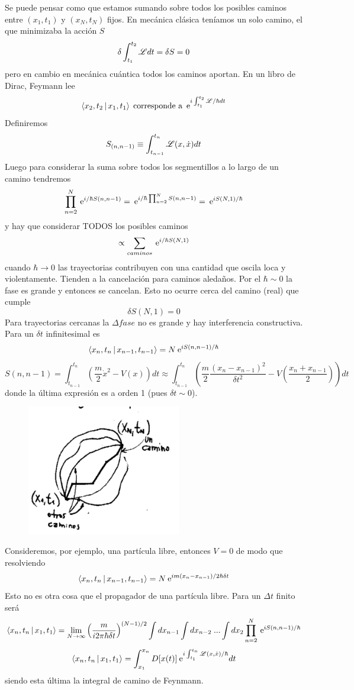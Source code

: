 \documentclass[10pt,oneside]{CBFT_book}
\begin{document}
Se puede pensar como que estamos sumando sobre todos los posibles caminos entre $(x_1,t_1)$ y $(x_N,t_N)$ 
fijos. En mecánica clásica teníamos un solo camino, el que minimizaba la acción $S$
\[
	\delta \int_{t_1}^{t_2} \mathscr{L} dt = \delta S = 0
\]
pero en cambio en mecánica cuántica todos los caminos aportan. En un libro de Dirac, Feymann lee 
\[
	\Braket{x_2,t_2|x_1,t_1} \; \text{corresponde a} \; \:\mathrm{e}^{i\int_{t_1}^{t_2}\mathscr{L}/\hbar dt}
\]
Definiremos
\[
	S_{(n,n-1)}\equiv \int_{t_{n-1}}^{t_n}\mathscr{L}(x,\dot{x}) dt
\]
Luego para considerar la suma sobre todos los segmentillos a lo largo de un camino tendremos
\[
	\prod_{n=2}^N \:\mathrm{e}^{i/\hbar S(n,n-1)} = \:\mathrm{e}^{i/\hbar \prod_{n=2}^N S(n,n-1)} = \:\mathrm{e}^{iS(N,1)/\hbar}
\]
y hay que considerar TODOS los posibles caminos 
\[
	\propto \sum_{caminos} \:\mathrm{e}^{i/\hbar S(N,1)} 
\]
cuando $\hbar \to 0$ las trayectorias contribuyen con una cantidad que oscila loca y violentamente. Tienden a 
la cancelación para caminos aledaños. Por el $\hbar \sim 0$ la fase es grande y entonces se cancelan.
Esto no ocurre cerca del camino (real) que cumple 
\[
	\delta S(N,1) = 0
\]
Para trayectorias cercanas la $\Delta fase$ no es grande y hay interferencia constructiva.
Para un $\delta t$ infinitesimal es 
\[
	\Braket{x_n,t_n|x_{n-1},t_{n-1}} = N \:\mathrm{e}^{iS(n,n-1)/\hbar}
\]
\[
	S(n,n-1) = \int_{t_{n-1}}^{t_n} \left( \frac{m}{2}\dot{x}^2 - V(x)\right) dt \approx
	\int_{t_{n-1}}^{t_n} \left( \frac{m}{2} \frac{(x_n-x_{n-1})^2}{\delta t^2} - 
	V\left(\frac{x_n+x_{n-1}}{2}\right)\right)  dt
\]
donde la última expresión es a orden 1 (pues $\delta t \sim 0$).
\begin{figure}[htb]
	\begin{center}
	\includegraphics[width=0.6\textwidth]{images/teo2_9.pdf}
	\end{center}
	\caption{}
\end{figure} 

Consideremos, por ejemplo, una partícula libre, entonces $V=0$ de modo que resolviendo 
\[
	\Braket{x_n,t_n|x_{n-1},t_{n-1}} = N \:\mathrm{e}^{im(x_n - x_{n-1})/2\hbar\delta t}
\]
Esto no es otra cosa que el propagador de una partícula libre. Para un $\Delta t$ finito será 
\[
	\Braket{x_n,t_n|x_1,t_1}  = \lim_{N\to\infty} \left(\frac{m}{i2\pi\hbar\delta t}\right)^{(N-1)/2}
	\int dx_{n-1}\int dx_{n-2} \; ... \int dx_2 \prod_{n=2}^N \:\mathrm{e}^{i S(n,n-1)/\hbar}
\]
\[
	\Braket{x_n,t_n|x_1,t_1}  = \int_{x_1}^{x_n} D[x(t)] \:\mathrm{e}^{i \int _{t_1}^{t_n} \mathscr{L}(x,\dot{x})/\hbar} dt
\]
siendo esta última la integral de camino de Feynmann.
\end{document}
